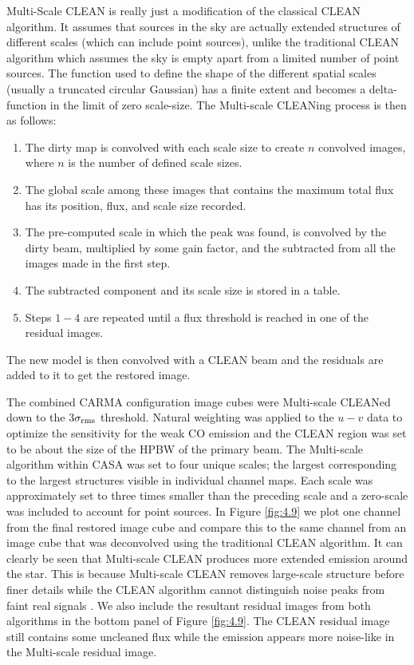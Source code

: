 Multi-Scale CLEAN is really just a modification of the classical CLEAN algorithm. It assumes that sources in the sky are actually extended structures of different scales (which can include point sources), unlike the traditional CLEAN algorithm which assumes the sky is empty apart from a limited number of point sources. The function used to define the shape of the different spatial scales (usually a truncated circular Gaussian) has a finite extent and becomes a delta-function in the limit of zero scale-size. The Multi-scale CLEANing process is then as follows:
\begin{enumerate}
\item The dirty map is convolved with each scale size to create $n$ convolved images, where $n$ is the number of defined scale sizes.
\item The global scale among these images that contains the maximum total flux has its position, flux, and scale size recorded.
\item The pre-computed scale in which the peak was found, is convolved by the dirty beam, multiplied by some gain factor, and the subtracted from all the images made in the first step.
\item The subtracted component and its scale size is stored in a table.
\item Steps $1-4$ are repeated until a flux threshold is reached in one of the residual images.
\end{enumerate}
The new model is then convolved with a CLEAN beam and the residuals are added to it to get the restored image.

The combined CARMA configuration image cubes were Multi-scale CLEANed down to the 3$\sigma _{\rm{rms}}$ threshold. Natural weighting was applied to the $u-v$ data to optimize the sensitivity for the weak CO emission and the CLEAN region was set to be about the size of the HPBW of the primary beam. The Multi-scale algorithm  within CASA was set to four unique scales; the largest corresponding to the largest structures visible in individual channel maps. Each scale was approximately set to three times smaller than the preceding scale and a zero-scale was included to account for point sources. In Figure \ref{fig:4.9} we plot one channel from the final restored image cube and compare this to the same channel from an image cube that was deconvolved using the traditional CLEAN algorithm. It can clearly be seen that Multi-scale CLEAN produces more extended emission around the star. This is because Multi-scale CLEAN removes large-scale structure before finer details while the CLEAN algorithm cannot distinguish noise peaks from faint real signals \citep{rich_2008}. We also include the resultant residual images from both algorithms in the bottom panel of Figure \ref{fig:4.9}. The CLEAN residual image still contains some uncleaned flux while the emission appears more noise-like in the Multi-scale residual image.